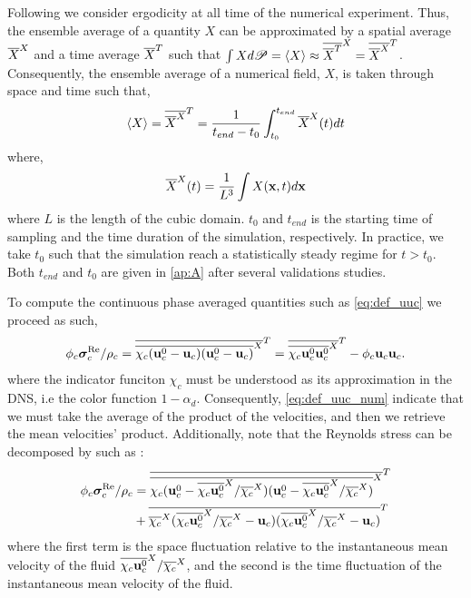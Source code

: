 \documentclass[12pt]{My_preprint}
\begin{document}
Following \citet{du2022analysis} we consider ergodicity at all time of the numerical experiment.
Thus, the ensemble average of a quantity $X$ can be approximated by a spatial average $\overline{X}^X$ and a time average $\overline{X}^T$ such that $\int X d\mathscr{P} = \left<X\right> \approx \overline{\overline{X}^T}^X = \overline{\overline{X}^X}^T$.
Consequently, the ensemble average of a numerical field, $X$, is taken through space and time such that,
\begin{equation}
    \left<X\right>
    = \overline{\overline{X}^X}^T
    = \frac{1}{ t_{end} - t_0}\int_{t_0}^{t_{end}} 
    \overline{X}^X(t) dt
\end{equation}
where, 
\begin{equation}
    \overline{X}^X(t)
    = \frac{1}{L^3}\int 
    X(\textbf{x},t) d\textbf{x}
\end{equation}
where $L$ is the length of the cubic domain.
$t_0$ and $t_{end}$ is the starting time of sampling and the time duration of the simulation, respectively.
In practice, we take $t_0$ such that the simulation reach a statistically steady regime for $t>t_0$.  
Both $t_{end} $ and $t_0$ are given in \ref{ap:A} after several validations studies. 

To compute the continuous phase averaged quantities such as \ref{eq:def_uuc} we proceed as such,
\begin{equation}
    \phi_c \bm{\sigma}^{\text{Re}}_c /\rho_c
    = \overline{\overline{\chi_c (\textbf{u}_c^0 -\textbf{u}_c ) (\textbf{u}_c^0 -\textbf{u}_c)}^X}^T
    = \overline{\overline{\chi_c \textbf{u}_c^0 \textbf{u}_c^0}^X}^T
    -  \phi_c  \textbf{u}_c \textbf{u}_c.
    \label{eq:def_uuc_num} 
\end{equation}
where the indicator funciton $\chi_c$ must be understood as its approximation in the DNS, i.e the color function $1 - \alpha_d$. 
Consequently, \ref{eq:def_uuc_num} indicate that we must take the average of the product of the velocities, and then we retrieve the mean velocities' product. 
Additionally,  note that the Reynolds stress can be decomposed by such as : 
\begin{align*}
    \phi_c \bm{\sigma}^{\text{Re}}_c /\rho_c
    &= 
    \overline{\overline{\chi_c (\textbf{u}_c^0 -\overline{\chi_c\textbf{u}_c^0}^X / \overline{\chi_c}^X ) (\textbf{u}_c^0 -\overline{\chi_c\textbf{u}_c^0}^X / \overline{\chi_c}^X )}^X}^T\\
    &+ \overline{\overline{\chi_c}^X (\overline{\chi_c\textbf{u}_c^0}^X / \overline{\chi_c}^X - \textbf{u}_c ) (\overline{\chi_c\textbf{u}_c^0}^X / \overline{\chi_c}^X - \textbf{u}_c)}^T\\
\end{align*}
where the first term is the space fluctuation relative to the instantaneous mean velocity of the fluid $\overline{\chi_c\textbf{u}_c^0}^X / \overline{\chi_c}^X$, and the second is the time fluctuation of the instantaneous mean velocity of the fluid. 
\end{document}

